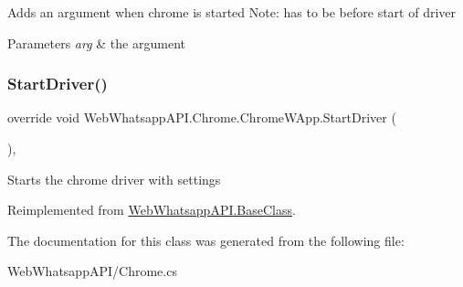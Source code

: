 Adds an argument when chrome is started Note\+: has to be before start of driver 


\begin{DoxyParams}{Parameters}
{\em arg} & the argument\\
\hline
\end{DoxyParams}
\mbox{\label{class_web_whatsapp_a_p_i_1_1_chrome_1_1_chrome_w_app_a2ed5da636b9baf0766bd6804739a9bfb}} 
\subsubsection{\texorpdfstring{Start\+Driver()}{StartDriver()}}
{\footnotesize\ttfamily override void Web\+Whatsapp\+A\+P\+I.\+Chrome.\+Chrome\+W\+App.\+Start\+Driver (\begin{DoxyParamCaption}{ }\end{DoxyParamCaption})\hspace{0.3cm}{\ttfamily [inline]}, {\ttfamily [virtual]}}



Starts the chrome driver with settings 



Reimplemented from \hyperlink{class_web_whatsapp_a_p_i_1_1_base_class_a8108d46b4176fc74fb49626e8122df88}{Web\+Whatsapp\+A\+P\+I.\+Base\+Class}.



The documentation for this class was generated from the following file\+:\begin{DoxyCompactItemize}
\item 
Web\+Whatsapp\+A\+P\+I/Chrome.\+cs\end{DoxyCompactItemize}
